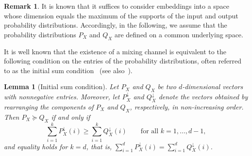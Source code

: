 \documentclass[aps,pra,11pt,onecolumn,nofootinbib,tightenlines]{revtex4-2}
\newtheorem{lemma}[theorem]{Lemma}
\theoremstyle{definition}
\newtheorem{remark}[theorem]{Remark}
\begin{document}
\begin{remark}
    It is known that it suffices to consider embeddings into a space whose dimension equals the maximum of the supports of the input and output probability distributions. Accordingly, in the following, we assume that the probability distributions $P_X$ and $Q_X$ are defined on a common underlying space.
\end{remark}
It is well known that the existence of a mixing channel is equivalent to the following condition on the entries of the probability distributions, often referred to as the initial sum condition~\cite{birkhoff1946tres} (see also~\cite{marshall1979inequalities}).
\begin{lemma}[Initial sum condition]
\label{lem: Initial sum condition}
Let \( P_X \) and \( Q_X \) be two $d$-dimensional vectors with nonnegative entries. Moreover, let \( P_X^{\downarrow} \) and \( Q_X^{\downarrow} \) denote the vectors obtained by rearranging the components of \( P_X \) and \( Q_X \), respectively, in non-increasing order. Then \( P_X \succeq Q_X \) if and only if
\begin{equation}
    \sum_{i=1}^{k} P_X^{\downarrow}(i) \geq \sum_{i=1}^{k} Q_X^{\downarrow}(i) \qquad \text{for all } k = 1, \ldots, d-1,
\end{equation}
and equality holds for \( k = d \), that is, $\sum_{i=1}^{d} P_X^{\downarrow}(i) = \sum_{i=1}^{d} Q_X^{\downarrow}(i)$.
\end{lemma}
\end{document}
